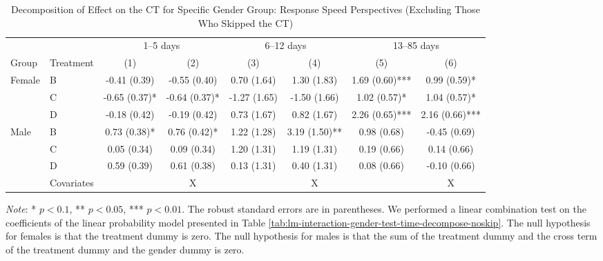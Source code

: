 \documentclass[12pt, a4paper]{article}
\begin{document}
\begin{table}[H]

\caption{\label{tab:lh-interaction-gender-test-time-decompose-noskip}Decomposition of Effect on the CT for Specific Gender Group: Response Speed Perspectives (Excluding Those Who Skipped the CT)}
\centering
\fontsize{8}{10}\selectfont
\begin{threeparttable}
\begin{tabular}[t]{llcccccc}
\toprule
\multicolumn{2}{c}{ } & \multicolumn{2}{c}{1--5 days} & \multicolumn{2}{c}{6--12 days} & \multicolumn{2}{c}{13--85 days} \\
\cmidrule(l{3pt}r{3pt}){3-4} \cmidrule(l{3pt}r{3pt}){5-6} \cmidrule(l{3pt}r{3pt}){7-8}
Group & Treatment & (1) & (2) & (3) & (4) & (5) & (6)\\
\midrule
Female & B & -0.41 (0.39) & -0.55 (0.40) & 0.70 (1.64) & 1.30 (1.83) & 1.69 (0.60)*** & 0.99 (0.59)*\\
 & C & -0.65 (0.37)* & -0.64 (0.37)* & -1.27 (1.65) & -1.50 (1.66) & 1.02 (0.57)* & 1.04 (0.57)*\\
 & D & -0.18 (0.42) & -0.19 (0.42) & 0.73 (1.67) & 0.82 (1.67) & 2.26 (0.65)*** & 2.16 (0.66)***\\
Male & B & 0.73 (0.38)* & 0.76 (0.42)* & 1.22 (1.28) & 3.19 (1.50)** & 0.98 (0.68) & -0.45 (0.69)\\
 & C & 0.05 (0.34) & 0.09 (0.34) & 1.20 (1.31) & 1.19 (1.31) & 0.19 (0.66) & 0.14 (0.66)\\
 & D & 0.59 (0.39) & 0.61 (0.38) & 0.13 (1.31) & 0.40 (1.31) & 0.08 (0.66) & -0.10 (0.66)\\
\midrule
 & Covariates &  & X &  & X &  & X\\
\bottomrule
\end{tabular}
\begin{tablenotes}
\item \emph{Note}: * $p < 0.1$, ** $p < 0.05$, *** $p < 0.01$. The robust standard errors are in parentheses. We performed a linear combination test on the coefficients of the linear probability model presented in Table \ref{tab:lm-interaction-gender-test-time-decompose-noskip}. The null hypothesis for females is that the treatment dummy is zero. The null hypothesis for males is that the sum of the treatment dummy and the cross term of the treatment dummy and the gender dummy is zero.
\end{tablenotes}
\end{threeparttable}
\end{table}
\end{document}
